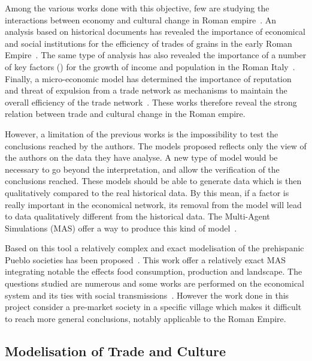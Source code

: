 \documentclass{wscpaperproc}
\begin{document}
Among the various works done with this objective, few are studying the interactions between economy and cultural change in Roman empire~\cite{terpstra_trade_2011,kessler_organization_2007,scheidel_model_2007}. 
An analysis based on historical documents has revealed the importance of economical and social institutions for the efficiency of trades of grains in the early Roman Empire~\cite{kessler_organization_2007}. The same type of analysis has also revealed the importance of a number of key factors () for the growth of income and population in the Roman Italy~\cite{scheidel_model_2007}. Finally, a micro-economic model has determined the importance of reputation and threat of expulsion from a trade network as mechanisms to maintain the overall efficiency of the trade network~\cite{terpstra_trade_2011}. These works therefore reveal the strong relation between trade and cultural change in the Roman empire.


However, a limitation of the previous works is the impossibility to test the conclusions reached by the authors. The models proposed reflects only the view of the authors on the data they have analyse. A new type of model would be necessary to go beyond the interpretation, and allow the verification of the conclusions reached. These models should be able to generate data which is then qualitatively compared to the real historical data. By this mean, if a factor is really important in the economical network, its removal from the model will lead to data qualitatively different from the historical data. The Multi-Agent Simulations (MAS) offer a way to produce this kind of model~\cite{lake_trends_2014}.

Based on this tool a relatively complex and exact modelisation of the prehispanic Pueblo societies has been proposed~\cite{kohler_modelling_2012}. This work offer a relatively exact MAS integrating notable the effects food consumption, production and landscape. The questions studied are  numerous and some works are performed on the economical system and its ties with social transmissions~\cite{kobti_emergence_2006,cockburn_simulating_2013}. However the work done in this project consider a pre-market society in a specific village which makes it difficult to reach more general conclusions, notably applicable to the Roman Empire.


\subsection{Modelisation of Trade and Culture}
\end{document}
